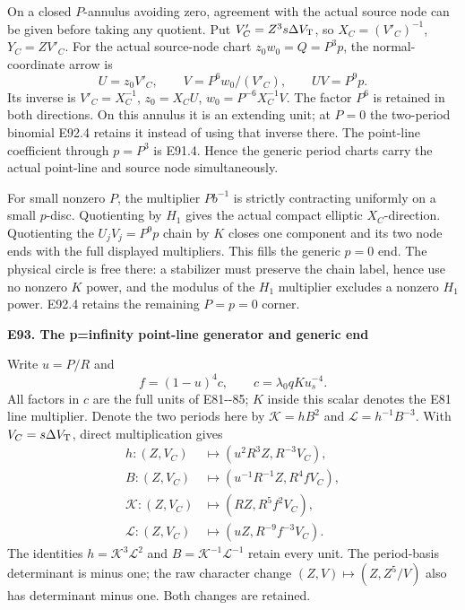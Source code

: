 On a closed \(P\)-annulus avoiding zero, agreement
with the actual source node can be given before taking
any quotient. Put \(V'_C=Z^3s\Delta V_{\rm T}\), so
\(X_C=(V'_C)^{-1}\), \(Y_C=ZV'_C\).
For the actual source-node chart \(z_0w_0=Q=P^3p\),
the normal-coordinate arrow is
\[
 U=z_0V'_C,\qquad V=P^6w_0/(V'_C),\qquad
 UV=P^9p.                                      \tag{E92.6}
\]
Its inverse is \(V'_C=X_C^{-1}\), \(z_0=X_CU\),
\(w_0=P^{-6}X_C^{-1}V\). The factor \(P^6\) is
retained in both directions. On this annulus it is an
extending unit; at \(P=0\) the two-period binomial
E92.4 retains it instead of using that inverse there.
The point-line coefficient through \(p=P^3\) is
E91.4. Hence the generic period charts carry the actual
point-line and source node simultaneously.

For small nonzero \(P\), the multiplier \(Pb^{-1}\)
is strictly contracting uniformly on a small \(p\)-disc.
Quotienting by \(H_1\) gives the actual compact elliptic
\(X_C\)-direction. Quotienting the \(U_jV_j=P^9p\)
chain by \(K\) closes one component and its two node
ends with the full displayed multipliers. This fills
the generic \(p=0\) end. The physical circle is free
there: a stabilizer must preserve the chain label,
hence use no nonzero \(K\) power, and the modulus of
the \(H_1\) multiplier excludes a nonzero \(H_1\)
power. E92.4 retains the remaining \(P=p=0\) corner.

\par

\medskip\noindent\textbf{E93. The p=infinity point-line generator and generic end}

\par\nobreak

Write \(u=P/R\) and
\[
 f=(1-u)^4c,\qquad c=\lambda_0qK u_s^{-4}.        \tag{E93.1}
\]
All factors in \(c\) are the full units of E81-\/-85;
\(K\) inside this scalar denotes the E81 line multiplier.
Denote the two periods here by \(\mathcal K=hB^2\)
and \(\mathcal L=h^{-1}B^{-3}\). With
\(V_C=s\Delta V_{\rm T}\), direct multiplication gives
\[
\begin{aligned}
 h:(Z,V_C)&\longmapsto(u^2R^3Z,R^{-3}V_C),\\
 B:(Z,V_C)&\longmapsto(u^{-1}R^{-1}Z,R^4fV_C),\\
 \mathcal K:(Z,V_C)&\longmapsto(RZ,R^5f^2V_C),\\
 \mathcal L:(Z,V_C)&\longmapsto(uZ,R^{-9}f^{-3}V_C).
\end{aligned}                                                   \tag{E93.2}
\]
The identities \(h=\mathcal K^3\mathcal L^2\) and
\(B=\mathcal K^{-1}\mathcal L^{-1}\) retain every
unit. The period-basis determinant is minus one;
the raw character change \((Z,V)\mapsto(Z,Z^5/V)\)
also has determinant minus one. Both changes are retained.

